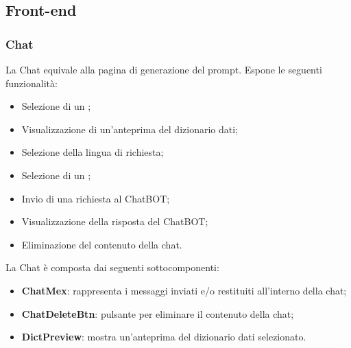 \subsection{Front-end}

\subsubsection{Chat}

\par La Chat equivale alla pagina di generazione del prompt. Espone le seguenti funzionalità:
\begin{itemize}
  \item Selezione di un ;
  \item Visualizzazione di un'anteprima del dizionario dati;
  \item Selezione della lingua di richiesta;
  \item Selezione di un ;
  \item Invio di una richiesta al ChatBOT;
  \item Visualizzazione della risposta del ChatBOT;
  \item Eliminazione del contenuto della chat.
\end{itemize}

\par La Chat è composta dai seguenti sottocomponenti:
\begin{itemize}
  \item \textbf{ChatMex}: rappresenta i messaggi inviati e/o restituiti all'interno della chat;
  \item \textbf{ChatDeleteBtn}: pulsante per eliminare il contenuto della chat;
  \item \textbf{DictPreview}: mostra un'anteprima del dizionario dati selezionato.
\end{itemize}

